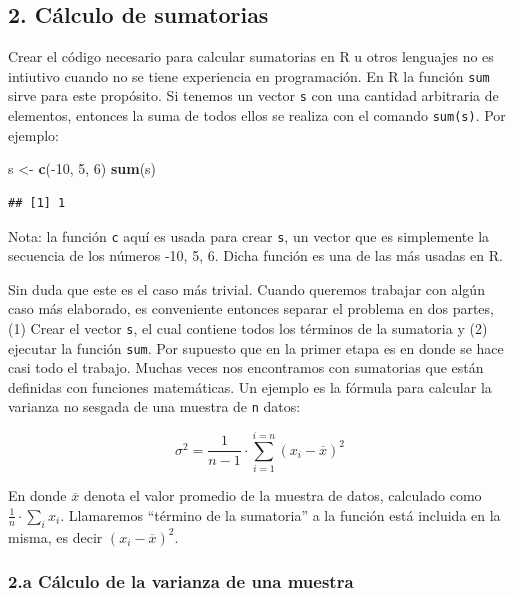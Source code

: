 \documentclass[]{article}
\newenvironment{Shaded}{}{}
\newcommand{\KeywordTok}[1]{\textcolor[rgb]{0.00,0.44,0.13}{\textbf{{#1}}}}
\newcommand{\DecValTok}[1]{\textcolor[rgb]{0.25,0.63,0.44}{{#1}}}
\newcommand{\NormalTok}[1]{{#1}}
\begin{document}
\subsection{2. Cálculo de sumatorias}

Crear el código necesario para calcular sumatorias en R u otros
lenguajes no es intiutivo cuando no se tiene experiencia en
programación. En R la función \texttt{sum} sirve para este propósito. Si
tenemos un vector \texttt{s} con una cantidad arbitraria de elementos,
entonces la suma de todos ellos se realiza con el comando
\texttt{sum(s)}. Por ejemplo:

\begin{Shaded}
\begin{Highlighting}[]
\NormalTok{s <- }\KeywordTok{c}\NormalTok{(-}\DecValTok{10}\NormalTok{, }\DecValTok{5}\NormalTok{, }\DecValTok{6}\NormalTok{)}
\KeywordTok{sum}\NormalTok{(s)}
\end{Highlighting}
\end{Shaded}
\begin{verbatim}
## [1] 1
\end{verbatim}
Nota: la función \texttt{c} aquí es usada para crear \texttt{s}, un
vector que es simplemente la secuencia de los números -10, 5, 6. Dicha
función es una de las más usadas en R.

Sin duda que este es el caso más trivial. Cuando queremos trabajar con
algún caso más elaborado, es conveniente entonces separar el problema en
dos partes, (1) Crear el vector \texttt{s}, el cual contiene todos los
términos de la sumatoria y (2) ejecutar la función \texttt{sum}. Por
supuesto que en la primer etapa es en donde se hace casi todo el
trabajo. Muchas veces nos encontramos con sumatorias que están definidas
con funciones matemáticas. Un ejemplo es la fórmula para calcular la
varianza no sesgada de una muestra de \texttt{n} datos:

\[\sigma ^ 2 = \frac{1}{n - 1} \cdot \sum_{i=1}^{i=n} (x_i - \overline{x}) ^ 2\]

En donde $\overline{x}$ denota el valor promedio de la muestra de datos,
calculado como $\frac{1}{n} \cdot \sum_i x_i$. Llamaremos ``término de
la sumatoria'' a la función está incluida en la misma, es decir
$(x_i - \overline{x}) ^ 2$.

\subsubsection{2.a Cálculo de la varianza de una muestra}
\end{document}
